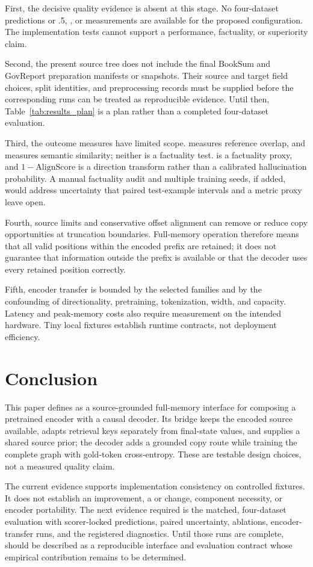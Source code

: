 First, the decisive quality evidence is absent at this stage.  No
four-dataset predictions or .5, \AlignScore, or \BERTScore measurements
are available for the proposed \EviSeq configuration.  The implementation
tests cannot support a performance, factuality, or superiority claim.

Second, the present source tree does not include the final BookSum and
GovReport preparation manifests or snapshots.  Their source and target field
choices, split identities, and preprocessing records must be supplied before
the corresponding runs can be treated as reproducible evidence.  Until then,
Table~\ref{tab:results_plan} is a plan rather than a completed four-dataset
evaluation.

Third, the outcome measures have limited scope.  \Rouge measures reference
overlap, and \BERTScore measures semantic similarity; neither is a factuality
test.  \AlignScore is a factuality proxy, and $1-\mathrm{AlignScore}$ is a
direction transform rather than a calibrated hallucination probability.  A
manual factuality audit and multiple training seeds, if added, would address
uncertainty that paired test-example intervals and a metric proxy leave open.

Fourth, source limits and conservative offset alignment can remove or reduce
copy opportunities at truncation boundaries.  Full-memory operation therefore
means that all valid positions within the encoded prefix are retained; it does
not guarantee that information outside the prefix is available or that the
decoder uses every retained position correctly.

Fifth, encoder transfer is bounded by the selected families and by the
confounding of directionality, pretraining, tokenization, width, and
capacity.  Latency and peak-memory costs also require measurement on the
intended hardware.  Tiny local fixtures establish runtime contracts, not
deployment efficiency.

\section{Conclusion}
\label{sec:conclusion}

This paper defines \EviSeq as a source-grounded full-memory interface for
composing a pretrained encoder with a causal decoder.  Its \AFMR bridge keeps
the encoded source available, adapts retrieval keys separately from
final-state values, and supplies a shared source prior; the decoder adds a
grounded copy route while training the complete graph with gold-token
cross-entropy.  These are testable design choices, not a measured quality
claim.

The current evidence supports implementation consistency on controlled
fixtures.  It does not establish an \AlignScore improvement, a \Rouge or
\BERTScore change, component necessity, or encoder portability.  The next
evidence required is the matched, four-dataset evaluation with scorer-locked
predictions, paired uncertainty, ablations, encoder-transfer runs, and the
registered diagnostics.  Until those runs are complete, \EviSeq should be
described as a reproducible interface and evaluation contract whose empirical
contribution remains to be determined.
